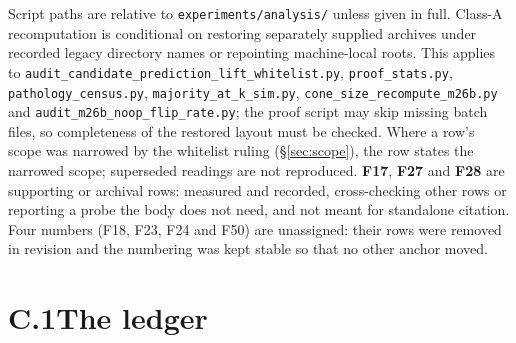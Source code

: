 Script paths are relative to \texttt{experiments/analysis/} unless given in
full. Class-A recomputation is conditional on restoring separately supplied
archives under recorded legacy directory names or repointing machine-local
roots. This applies to \texttt{audit\_\allowbreak candidate\_\allowbreak prediction\_\allowbreak lift\_\allowbreak whitelist.py},
\texttt{proof\_\allowbreak stats.py}, \texttt{pathology\_\allowbreak census.py},
\texttt{majority\_\allowbreak at\_\allowbreak k\_\allowbreak sim.py}, \texttt{cone\_\allowbreak size\_\allowbreak recompute\_\allowbreak m26b.py}
and \texttt{audit\_\allowbreak m26b\_\allowbreak noop\_\allowbreak flip\_\allowbreak rate.py}; the proof script may skip
missing batch files, so completeness of the restored layout must be checked. Where a row's scope was narrowed by the whitelist ruling
(\S\ref{sec:scope}), the row states the narrowed scope; superseded readings
are not reproduced. \textbf{F17},
\textbf{F27} and \textbf{F28}
are supporting or archival rows: measured and recorded, cross-checking other rows or reporting a
probe the body does not need, and not meant for standalone citation. Four
numbers (F18, F23, F24 and F50) are unassigned: their rows were removed in
revision and the numbering was kept stable so that no other anchor moved.

\section*{C.1\quad The ledger}

